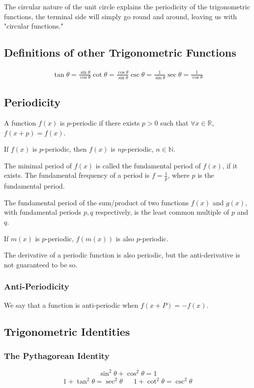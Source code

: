 \documentclass{article}
\begin{document}
The circular nature of the unit circle explains the periodicity of the trigonometric functions, the terminal side will simply go round and around, leaving us with "circular functions."

\subsection{Definitions of other Trigonometric Functions}
\begin{align}
    \tan{\theta} = \frac{\sin{\theta}}{\cos{\theta}}
    \cot{\theta} = \frac{\cos{\theta}}{\sin{\theta}}
    \csc{\theta} = \frac{1}{\sin{\theta}}
    \sec{\theta} = \frac{1}{\cos{\theta}}
\end{align}

\subsection{Periodicity}
A function $f(x)$ is $p$-periodic if there exists $p>0$ such that $\forall x \in \mathbb{R}$, $f(x+p)=f(x)$.

If $f(x)$ is $p$-periodic, then $f(x)$ is $np$-periodic, $n\in\mathbb{N}$.

The minimal period of $f(x)$ is called the fundamental period of $f(x)$, if it exists. The fundamental frequency of a period is $f=\frac{1}{p}$, where $p$ is the fundamental period.

The fundamental period of the sum/product of two functions $f(x)$ and $g(x)$, with fundamental periods $p,q$ respectively, is the least common multiple of $p$ and $q$.

If $m(x)$ is $p$-periodic, $f(m(x))$ is also $p$-periodic.

The derivative of a periodic function is also periodic, but the anti-derivative is not guaranteed to be so.

\subsubsection{Anti-Periodicity}
We say that a function is anti-periodic when $f(x+P)=-f(x)$.

\subsection{Trigonometric Identities}
\subsubsection{The Pythagorean Identity}
$$\sin^2{\theta}+\cos^2{\theta}=1$$
\begin{align*}
    1+\tan^2{\theta}=\sec^2{\theta}&&
    1+\cot^2{\theta}=\csc^2{\theta}
\end{align*}
\end{document}
